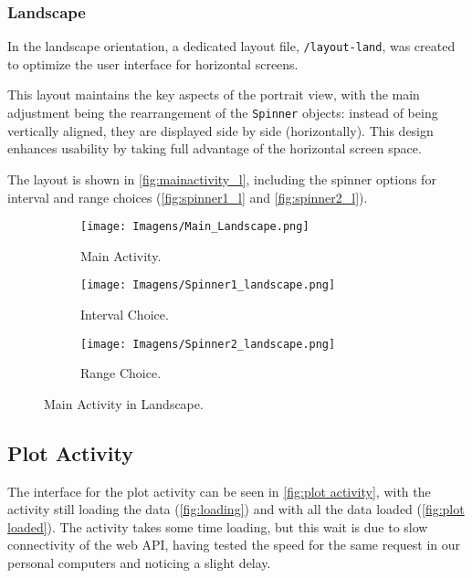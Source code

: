\documentclass{article}
\begin{document}
\subsubsection{Landscape}

In the landscape orientation, a dedicated layout file, \texttt{/layout-land}, was created to optimize the user interface for horizontal screens. 

This layout maintains the key aspects of the portrait view, with the main adjustment being the rearrangement of the \texttt{Spinner} objects: instead of being vertically aligned, they are displayed side by side (horizontally). This design enhances usability by taking full advantage of the horizontal screen space.

The layout is shown in \autoref{fig:mainactivity_l}, including the spinner options for interval and range choices (\autoref{fig:spinner1_l} and \autoref{fig:spinner2_l}).

\begin{figure}[ht]
    \centering
    \begin{subfigure}[t]{0.8\textwidth} 
        \centering
        \texttt{[image: Imagens/Main\_Landscape.png]}
        \caption{Main Activity.}
        \label{fig:mainactivity_l}
    \end{subfigure}

    \vspace{1em} 

    \begin{subfigure}[t]{0.8\textwidth}
        \centering
        \texttt{[image: Imagens/Spinner1\_landscape.png]}
        \caption{Interval Choice.}
        \label{fig:spinner1_l}
    \end{subfigure}

    \vspace{1em} 

    \begin{subfigure}[t]{0.8\textwidth}
        \centering
        \texttt{[image: Imagens/Spinner2\_landscape.png]}
        \caption{Range Choice.}
        \label{fig:spinner2_l}
    \end{subfigure}

    \caption{Main Activity in Landscape.}
    \label{fig:whole_main_activity}
\end{figure}

\subsection{Plot Activity}
The interface for the plot activity can be seen in \autoref{fig:plot activity}, with the activity still loading the data (\autoref{fig:loading}) and with all the data loaded (\autoref{fig:plot loaded}).
The activity takes some time loading, but this wait is due to slow connectivity of the web API, having tested the speed for the same request in our personal computers and noticing a slight delay.
\end{document}
